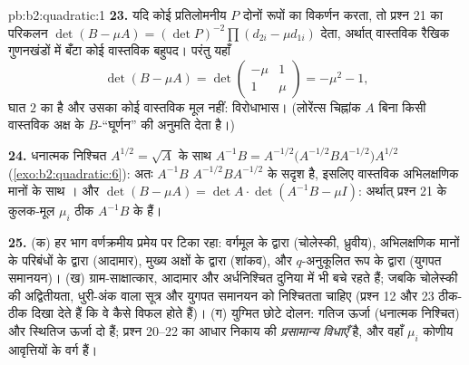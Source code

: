 \begin{solution}{pb:b2:quadratic:1}
\textbf{23.} यदि कोई प्रतिलोमनीय $P$ दोनों रूपों का विकर्णन करता, तो
प्रश्न 21 का परिकलन $\det(B - \mu A) = (\det
P)^{-2}\prod(d_{2i} - \mu d_{1i})$ देता, अर्थात् वास्तविक रैखिक गुणनखंडों में बँटा
कोई वास्तविक बहुपद। परंतु यहाँ
\[
\det(B - \mu A) = \det\begin{pmatrix} -\mu & 1\\ 1 &
\mu\end{pmatrix} = -\mu^2 - 1 ,
\]
घात $2$ का है और उसका कोई वास्तविक मूल नहीं: विरोधाभास। (लोरेंत्स
चिह्नांक $A$ बिना किसी वास्तविक अक्ष के $B$-``घूर्णन'' की अनुमति देता है।)

\textbf{24.} धनात्मक निश्चित $A^{1/2} = \sqrt A$ के साथ $A^{-1}B = A^{-1/2}\bigl(A^{-1/2}BA^{-1/2}\bigr)
A^{1/2}$ (\cref{exo:b2:quadratic:6}): अतः $A^{-1}B$ \emph{}
$A^{-1/2}BA^{-1/2}$ के सदृश है, इसलिए वास्तविक अभिलक्षणिक मानों के साथ । और $\det(B - \mu A) = \det A\cdot
\det(A^{-1}B - \mu I)$:
अर्थात् प्रश्न 21 के कुलक-मूल $\mu_i$ ठीक $A^{-1}B$ के  हैं।

\textbf{25.} (क) हर भाग वर्णक्रमीय प्रमेय पर टिका रहा: वर्गमूल के द्वारा
(चोलेस्की, ध्रुवीय), अभिलक्षणिक मानों के परिबंधों के द्वारा (आदामार),
मुख्य अक्षों के द्वारा (शांकव), और $q$-अनुकूलित रूप के द्वारा (युगपत
समानयन)। (ख) ग्राम-साक्षात्कार, आदामार और  अर्धनिश्चित
दुनिया में भी बचे रहते हैं; जबकि चोलेस्की की अद्वितीयता, धुरी-अंक वाला
सूत्र और युगपत समानयन को निश्चितता चाहिए (प्रश्न 12 और 23 ठीक-ठीक दिखा
देते हैं कि वे कैसे विफल होते हैं)। (ग) युग्मित छोटे दोलन: गतिज ऊर्जा
(धनात्मक निश्चित) और स्थितिज ऊर्जा दो  हैं; प्रश्न 20--22 का
आधार निकाय की \emph{प्रसामान्य विधाएँ} है, और वहाँ $\mu_i$ कोणीय आवृत्तियों
के वर्ग हैं।
\end{solution}

